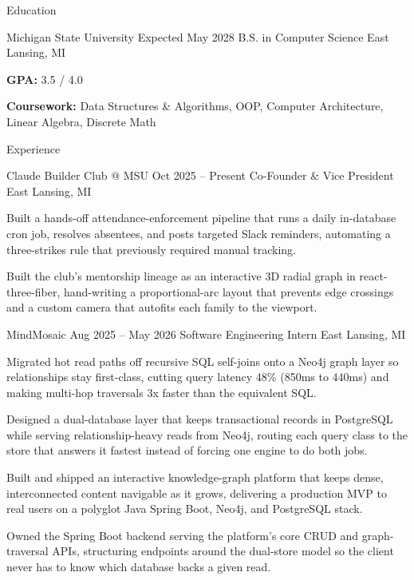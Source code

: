 \documentclass[
	11pt
]{../../../template}
\begin{document}
	\begin{rSection}{E}{ducation}
		\begin{rSectionEntry}
			{Michigan State University}
			{Expected May 2028}
			{B.S. in Computer Science}
			{}
			{East Lansing, MI}

			\item \textbf{GPA:} 3.5 / 4.0
			\item \textbf{Coursework:} Data Structures \& Algorithms, OOP, Computer Architecture, Linear Algebra, Discrete Math
		\end{rSectionEntry}
	\end{rSection}

	\begin{rSection}{E}{xperience}
		\begin{rSectionEntry}
			{Claude Builder Club @ MSU}
			{Oct 2025 -- Present}
			{Co-Founder \& Vice President}
			{}
			{East Lansing, MI}

			\item Built a hands-off attendance-enforcement pipeline that runs a daily in-database cron job, resolves absentees, and posts targeted Slack reminders, automating a three-strikes rule that previously required manual tracking.
			\item Built the club's mentorship lineage as an interactive 3D radial graph in react-three-fiber, hand-writing a proportional-arc layout that prevents edge crossings and a custom camera that autofits each family to the viewport.
		\end{rSectionEntry}

		\begin{rSectionEntry}
			{MindMosaic}
			{Aug 2025 -- May 2026}
			{Software Engineering Intern}
			{}
			{East Lansing, MI}

			\item Migrated hot read paths off recursive SQL self-joins onto a Neo4j graph layer so relationships stay first-class, cutting query latency 48\% (850ms to 440ms) and making multi-hop traversals 3x faster than the equivalent SQL.
			\item Designed a dual-database layer that keeps transactional records in PostgreSQL while serving relationship-heavy reads from Neo4j, routing each query class to the store that answers it fastest instead of forcing one engine to do both jobs.
			\item Built and shipped an interactive knowledge-graph platform that keeps dense, interconnected content navigable as it grows, delivering a production MVP to real users on a polyglot Java Spring Boot, Neo4j, and PostgreSQL stack.
			\item Owned the Spring Boot backend serving the platform's core CRUD and graph-traversal APIs, structuring endpoints around the dual-store model so the client never has to know which database backs a given read.
		\end{rSectionEntry}

	\end{rSection}
\end{document}
